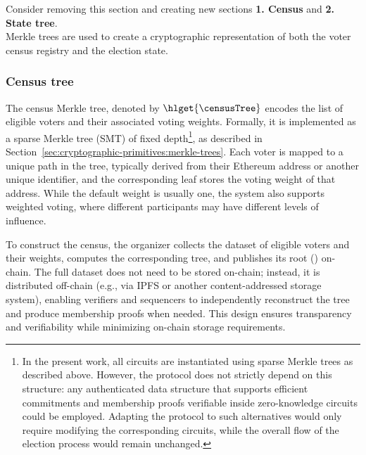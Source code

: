 
{\color{blue}Consider removing this section and creating new sections \textbf{1. Census} and \textbf{2. State tree}.}\\

\noi Merkle trees are used to create a cryptographic representation of both the voter census registry and the election state. 


\subsubsection{Census tree} 
\label{sec:vocdoni-protocol:merkle-trees:census}

The census Merkle tree, denoted by $\hlget{\censusTree}$ encodes the list of eligible voters and their associated voting weights. Formally, it is implemented as a sparse Merkle tree (SMT) of fixed depth\footnote{In the present work, all circuits are instantiated using sparse Merkle trees as described above. However, the protocol does not strictly depend on this structure: any authenticated data structure that supports efficient commitments and membership proofs verifiable inside zero-knowledge circuits could be employed. Adapting the protocol to such alternatives would only require modifying the corresponding circuits, while the overall flow of the election process would remain unchanged.}, as described in Section~\ref{sec:cryptographic-primitives:merkle-trees}. Each voter is mapped to a unique path in the tree, typically derived from their Ethereum address or another unique identifier, and the corresponding leaf stores the voting weight of that address. While the default weight is usually one, the system also supports weighted voting, where different participants may have different levels of influence.

To construct the census, the organizer collects the dataset of eligible voters and their weights, computes the corresponding tree, and publishes its root (\censusroot) on-chain. The full dataset does not need to be stored on-chain; instead, it is distributed off-chain (e.g., via IPFS or another content-addressed storage system), enabling verifiers and sequencers to independently reconstruct the tree and produce membership proofs when needed. This design ensures transparency and verifiability while minimizing on-chain storage requirements.

